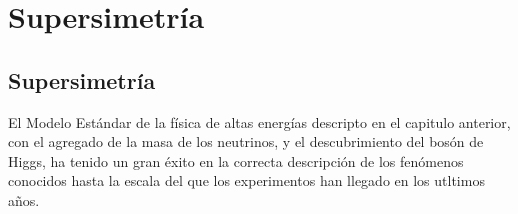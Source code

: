 \chapter{Supersimetría} %

\newcommand{\GM}{gauge mediation}






\section{Supersimetría}

El Modelo Est\'andar de la f\'isica de altas energ\'ias descripto en el capitulo anterior,
con el agregado de la masa de los neutrinos, y el descubrimiento del bos\'on de Higgs,
ha tenido un gran \'exito en la correcta descripci\'on de los fenómenos conocidos hasta la escala
del {\tev} que los experimentos han llegado en los utltimos a\~nos.

